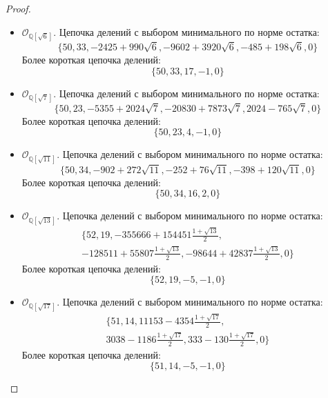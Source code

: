 \documentclass[_00_dissertation.tex]{subfiles}
\begin{document}
\begin{proof}
\begin{itemize}
        \item $\mathcal{O}_{\mathbb{Q}[\sqrt{6}]}$.
        Цепочка делений с выбором минимального по норме остатка:
        \begin{equation*}
            \{50, 33, -2425+990\sqrt{6}, -9602+3920\sqrt{6}, -485+198\sqrt{6}, 0\}
        \end{equation*}
        Более короткая цепочка делений:
        \begin{equation*}
            \{50, 33, 17, -1, 0\}
        \end{equation*}

        \item $\mathcal{O}_{\mathbb{Q}[\sqrt{7}]}$.
        Цепочка делений с выбором минимального по норме остатка:
        \begin{equation*}
            \{50, 23, -5355+2024\sqrt{7}, -20830+7873\sqrt{7}, 2024-765\sqrt{7}, 0\}
        \end{equation*}
        Более короткая цепочка делений:
        \begin{equation*}
            \{50, 23, 4, -1, 0\}
        \end{equation*}

        \item $\mathcal{O}_{\mathbb{Q}[\sqrt{11}]}$.
        Цепочка делений с выбором минимального по норме остатка:
        \begin{equation*}
            \{50, 34, -902+272\sqrt{11}, -252+76\sqrt{11}, -398+120\sqrt{11}, 0\}
        \end{equation*}
        Более короткая цепочка делений:
        \begin{equation*}
            \{50, 34, 16, 2, 0\}
        \end{equation*}

        \item $\mathcal{O}_{\mathbb{Q}[\sqrt{13}]}$.
        Цепочка делений с выбором минимального по норме остатка:
        \begin{multline*}
            \{52, 19, -355666+154451\frac{1+\sqrt{13}}{2},\\
            -128511+55807\frac{1+\sqrt{13}}{2}, -98644+42837\frac{1+\sqrt{13}}{2}, 0\}
        \end{multline*}
        Более короткая цепочка делений:
        \begin{equation*}
            \{52, 19, -5, -1, 0\}
        \end{equation*}

        \item $\mathcal{O}_{\mathbb{Q}[\sqrt{17}]}$.
        Цепочка делений с выбором минимального по норме остатка:
        \begin{multline*}
            \{51, 14, 11153-4354\frac{1+\sqrt{17}}{2},\\
            3038-1186\frac{1+\sqrt{17}}{2}, 333-130\frac{1+\sqrt{17}}{2}, 0\}
        \end{multline*}
        Более короткая цепочка делений:
        \begin{equation*}
            \{51, 14, -5, -1, 0\}
        \end{equation*}


\end{itemize}
\end{proof}
\end{document}
